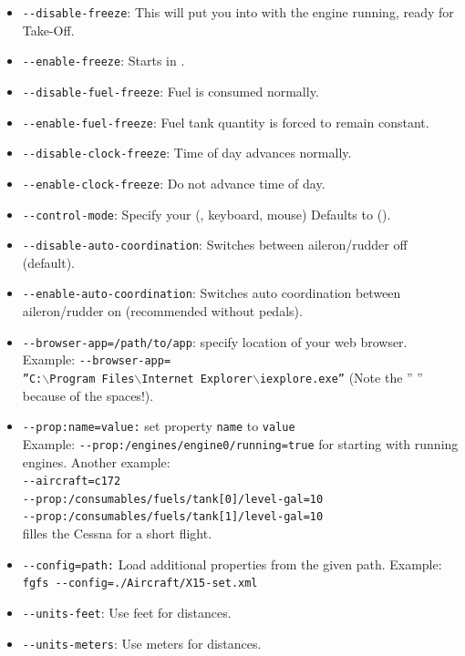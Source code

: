\begin{itemize}
\item{\texttt{-$ $-disable-freeze}}: This will put you into \FlightGear{} with the
  engine running, ready for Take-Off.
\item{\texttt{-$ $-enable-freeze}}: Starts \FlightGear{} in .
\item{\texttt{-$ $-disable-fuel-freeze}}: Fuel is consumed normally.
\item{\texttt{-$ $-enable-fuel-freeze}}: Fuel tank quantity is forced to remain constant.
\item{\texttt{-$ $-disable-clock-freeze}}: Time of day advances normally.
\item{\texttt{-$ $-enable-clock-freeze}}: Do not advance time of day.
\item{\texttt{-$ $-control-mode}}: Specify your  (,
 keyboard, mouse) Defaults to  ().
\item{\texttt{-$ $-disable-auto-coordination}}: Switches  between
aileron/rudder off (default).
\item{\texttt{-$ $-enable-auto-coordination}}: Switches auto coordination between
aileron/rudder on (recommended without pedals).
\item{\texttt{-$ $-browser-app=/path/to/app}}:  specify location of your web browser. Example:
\texttt{-$ $-browser-app=}\\  \texttt{''C:$\backslash$Program~Files$\backslash$Internet~Explorer$\backslash$iexplore.exe''} (Note the '' '' because of the spaces!).
\item{\texttt{-$ $-prop:name=value:}}  set property \texttt{name} to \texttt{value}\\Example:
\texttt{-$ $-prop:/engines/engine0/running=true} for starting with running engines. Another example:\\
\texttt{-$ $-aircraft=c172}\\
\texttt{-$ $-prop:/consumables/fuels/tank[0]/level-gal=10}\\
\texttt{-$ $-prop:/consumables/fuels/tank[1]/level-gal=10}\\
filles the Cessna for a short flight.
\item{\texttt{-$ $-config=path:}}  Load additional properties from the given path. Example: \texttt{fgfs -$ $-config=./Aircraft/X15-set.xml}
\item{\texttt{-$ $-units-feet}}: Use feet for distances.
\item{\texttt{-$ $-units-meters}}: Use meters for distances.
\end{itemize}
